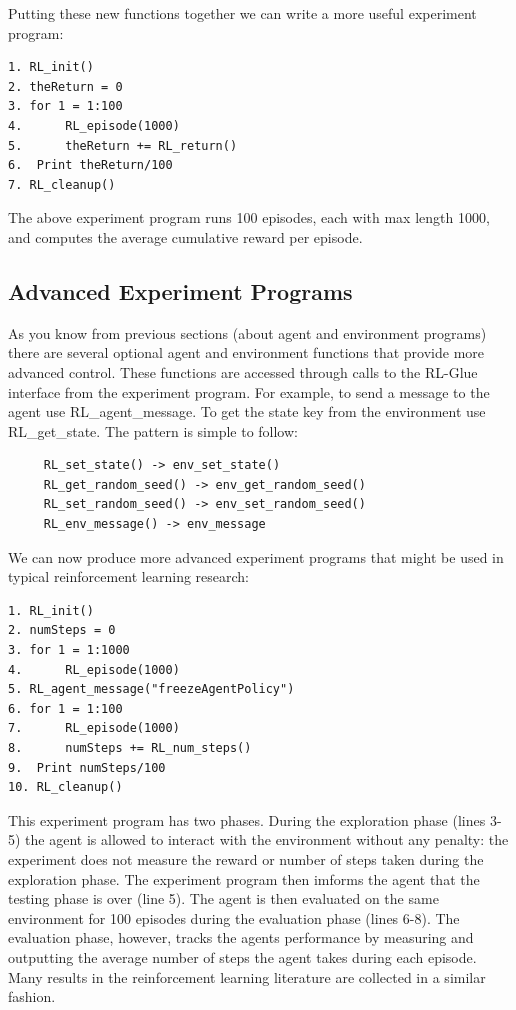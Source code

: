\documentclass[11pt]{article}
\begin{document}
Putting these new functions together we can write a more useful experiment program:
\begin{verbatim}
1. RL_init()
2. theReturn = 0
3. for 1 = 1:100
4.      RL_episode(1000)
5.      theReturn += RL_return()
6.  Print theReturn/100
7. RL_cleanup()
\end{verbatim}
The above experiment program runs 100 episodes, each with max length 1000, and computes the average cumulative reward per episode.
\subsection{Advanced Experiment Programs}
\label{expp2}


As you know from previous sections (about agent and environment programs) there are several optional agent and environment functions that provide more advanced control. These functions are accessed through calls to the RL-Glue interface from the experiment program. For example, to send a message to the agent use RL\_agent\_message. To get the state key from the environment use RL\_get\_state. The pattern is simple to follow:
\begin{verbatim}
     RL_set_state() -> env_set_state()
     RL_get_random_seed() -> env_get_random_seed()
     RL_set_random_seed() -> env_set_random_seed()
     RL_env_message() -> env_message
\end{verbatim}
We can now produce more advanced experiment programs that might be used in typical reinforcement learning research:
\begin{verbatim}
1. RL_init()
2. numSteps = 0
3. for 1 = 1:1000
4.      RL_episode(1000)
5. RL_agent_message("freezeAgentPolicy")
6. for 1 = 1:100
7.      RL_episode(1000)
8.      numSteps += RL_num_steps()
9.  Print numSteps/100
10. RL_cleanup()
\end{verbatim}
This experiment program has two phases. During the exploration phase (lines 3-5) the agent is allowed to interact with the environment without any penalty: the experiment does not measure the reward or number of steps taken during the exploration phase. The experiment program then imforms the agent that the testing phase is over (line 5). The agent is then evaluated on the same environment for 100 episodes during the evaluation phase (lines 6-8). The evaluation phase, however, tracks the agents performance by measuring and outputting the average number of steps the agent takes during each episode. Many results in the reinforcement learning literature are collected in a similar fashion.
\end{document}

